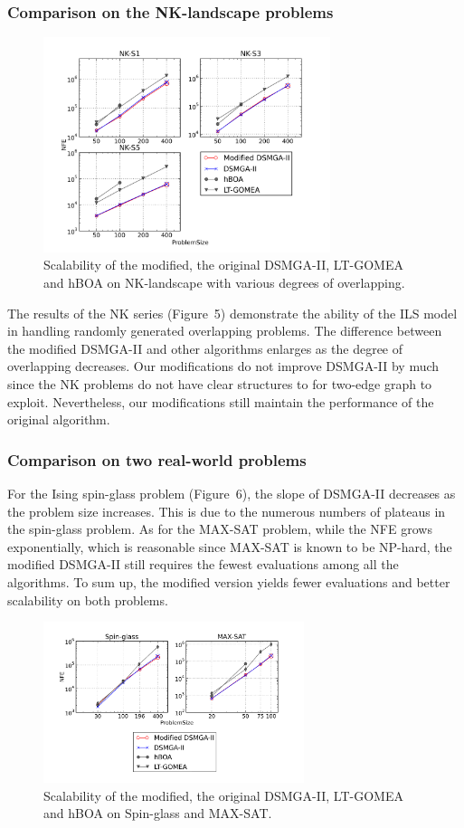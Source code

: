 \subsubsection{Comparison on the NK-landscape problems}

\begin{figure}
\centering
\includegraphics[width=3.3in]{nkResults}
\caption{Scalability of the modified, the original DSMGA-II, LT-GOMEA and hBOA on NK-landscape with various degrees of overlapping.}
\end{figure}


The results of the NK series (Figure~5) demonstrate the ability of the ILS model in handling randomly generated overlapping problems. 
The difference between the modified DSMGA-II and other algorithms enlarges as the degree of overlapping decreases. 
Our modifications do not improve DSMGA-II by much since the NK problems do not have clear structures to for two-edge graph to exploit. Nevertheless, our modifications still maintain the performance of the original algorithm. 

\subsubsection{ Comparison on two real-world problems }

For the Ising spin-glass problem (Figure~6), the slope of DSMGA-II decreases as the problem size increases. 
This is due to the numerous numbers of plateaus in the spin-glass problem.
As for the MAX-SAT problem, while the NFE grows exponentially, which is reasonable since MAX-SAT is known to be NP-hard, the modified DSMGA-II still requires the fewest evaluations among all the algorithms. To sum up, the modified version yields fewer evaluations and better scalability on both problems. 

\begin{figure}
\centering
\includegraphics[width=3in]{spin_satResults}
\caption{Scalability of the modified, the original DSMGA-II, LT-GOMEA and hBOA on Spin-glass and MAX-SAT.}
\end{figure}

